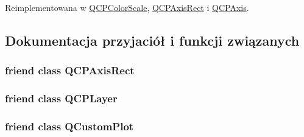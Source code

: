 Reimplementowana w \hyperlink{class_q_c_p_color_scale_a63cf19be184f6670c9495ad3a9a1baeb}{Q\+C\+P\+Color\+Scale}, \hyperlink{class_q_c_p_axis_rect_a93eeaa0c127d6d6fe8171b2455080262}{Q\+C\+P\+Axis\+Rect} i \hyperlink{class_q_c_p_axis_a71643d27524a843230b5ba68085b3d9b}{Q\+C\+P\+Axis}.



\subsection{Dokumentacja przyjaciół i funkcji związanych}
\subsubsection[{\texorpdfstring{Q\+C\+P\+Axis\+Rect}{QCPAxisRect}}]{\setlength{\rightskip}{0pt plus 5cm}friend class {\bf Q\+C\+P\+Axis\+Rect}\hspace{0.3cm}{\ttfamily [friend]}}\hypertarget{class_q_c_p_layerable_acbf20ecb140f66c5fd1bc64ae0762990}{}\label{class_q_c_p_layerable_acbf20ecb140f66c5fd1bc64ae0762990}
\subsubsection[{\texorpdfstring{Q\+C\+P\+Layer}{QCPLayer}}]{\setlength{\rightskip}{0pt plus 5cm}friend class {\bf Q\+C\+P\+Layer}\hspace{0.3cm}{\ttfamily [friend]}}\hypertarget{class_q_c_p_layerable_a5dbf96bf7664c1b6fce49063eeea6eef}{}\label{class_q_c_p_layerable_a5dbf96bf7664c1b6fce49063eeea6eef}
\subsubsection[{\texorpdfstring{Q\+Custom\+Plot}{QCustomPlot}}]{\setlength{\rightskip}{0pt plus 5cm}friend class {\bf Q\+Custom\+Plot}\hspace{0.3cm}{\ttfamily [friend]}}\hypertarget{class_q_c_p_layerable_a1cdf9df76adcfae45261690aa0ca2198}{}\label{class_q_c_p_layerable_a1cdf9df76adcfae45261690aa0ca2198}



